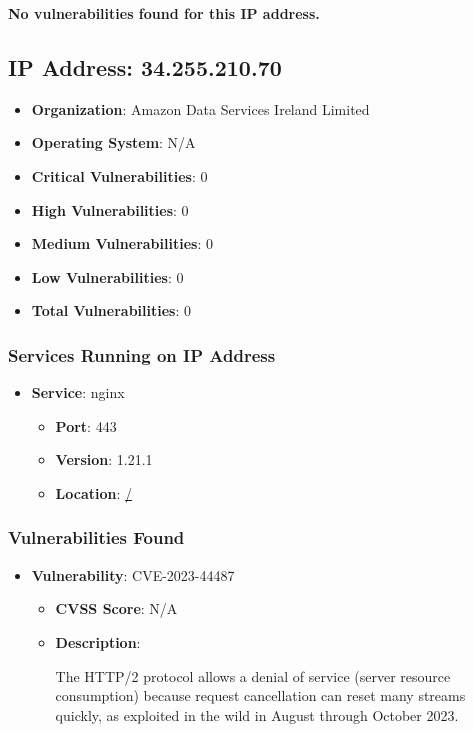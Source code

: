 \documentclass{article}
\begin{document}
\textbf{No vulnerabilities found for this IP address.}




\clearpage



\subsection{IP Address: 34.255.210.70}

\begin{itemize}
    \item \textbf{Organization}: Amazon Data Services Ireland Limited
    \item \textbf{Operating System}:  N/A 
    \item \textbf{Critical Vulnerabilities}: 0
    \item \textbf{High Vulnerabilities}: 0
    \item \textbf{Medium Vulnerabilities}: 0
    \item \textbf{Low Vulnerabilities}: 0
    \item \textbf{Total Vulnerabilities}: 0
\end{itemize}

\subsubsection*{Services Running on IP Address}

\begin{itemize}
    
        \item \textbf{Service}: nginx
        \begin{itemize}
            \item \textbf{Port}: 443
            \item \textbf{Version}:  1.21.1 
            \item \textbf{Location}: \href{ / }{ / }
        \end{itemize}
    
\end{itemize}


\subsubsection*{Vulnerabilities Found}

\begin{itemize}
    
        \item \textbf{Vulnerability}: CVE-2023-44487
        \begin{itemize}
            \item \textbf{CVSS Score}:  N/A 
            \item \textbf{Description}:
            \parbox[t]{0.9\linewidth}{
                \ttfamily The HTTP/2 protocol allows a denial of service (server resource consumption) because request cancellation can reset many streams quickly, as exploited in the wild in August through October 2023.
            }
        \end{itemize}
    
\end{itemize}
\end{document}
